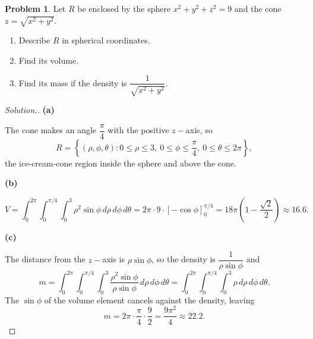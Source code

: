 \documentclass[11pt,a4paper]{article}
\theoremstyle{definition}
\newtheorem{problemx}{Problem}[subsection]
\newenvironment{problem}{\begin{problemx}}{\end{problemx}}
\newenvironment{solution}
  {\renewcommand{\qedsymbol}{}\begin{proof}[\textit{Solution}.]}
  {\end{proof}}
\newcommand{\subhead}[1]{%
  \par\medskip\noindent\textbf{#1}\par\nobreak\smallskip}
\begin{document}
\begin{problem}
Let $R$ be enclosed by the sphere $x^2+y^2+z^2 = 9$ and the cone
$z = \sqrt{x^2+y^2}$.
\begin{enumerate}
\item[(a)] Describe $R$ in spherical coordinates.
\item[(b)] Find its volume.
\item[(c)] Find its mass if the density is
$\dfrac{1}{\sqrt{x^2+y^2}}$.
\end{enumerate}
\end{problem}
\begin{solution}
\subhead{(a)}
The cone makes an angle $\dfrac{\pi}{4}$ with the positive $z-$axis, so
\[R = \left\{(\rho,\phi,\theta): 0\leq\rho\leq 3,\ 0\leq\phi\leq\frac{\pi}{4},\
0\leq\theta\leq 2\pi\right\},\]
the ice-cream-cone region inside the sphere and above the cone.

\subhead{(b)}
\[V = \int_0^{2\pi}\int_0^{\pi/4}\int_0^3\rho^2\sin\phi\,d\rho\,d\phi\,d\theta
= 2\pi\cdot 9\cdot[-\cos\phi]_0^{\pi/4}
= 18\pi\left(1-\frac{\sqrt2}{2}\right)\approx 16.6 .\]

\subhead{(c)}
The distance from the $z-$axis is $\rho\sin\phi$, so the density is
$\dfrac{1}{\rho\sin\phi}$ and
\[m = \int_0^{2\pi}\int_0^{\pi/4}\int_0^3
\frac{\rho^2\sin\phi}{\rho\sin\phi}\,d\rho\,d\phi\,d\theta
= \int_0^{2\pi}\int_0^{\pi/4}\int_0^3\rho\,d\rho\,d\phi\,d\theta .\]
The $\sin\phi$ of the volume element cancels against the density, leaving
\[m = 2\pi\cdot\frac{\pi}{4}\cdot\frac92 = \frac{9\pi^2}{4}\approx 22.2 .\]
\end{solution}
\end{document}
